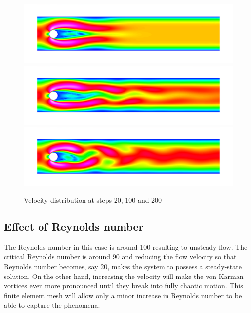 \begin{figure}[h]
\centering
\includegraphics[width=12cm, viewport=0 30 1089 270,clip]{flow20.png}
\includegraphics[width=12cm, viewport=0 30 1089 270,clip]{flow100.png}
\includegraphics[width=12cm, viewport=0 30 1089 270,clip]{flow200.png}
\caption{Velocity distribution at steps 20, 100 and 200}\label{fg:vonkarman_flow}
\end{figure} 


\subsection*{Effect of Reynolds number}
The Reynolds number in this case is around 100 resulting to unsteady flow.
The critical Reynolds number is around 90 and 
reducing the flow velocity so that Reynolds number becomes, say 20, makes the 
system to possess a steady-state solution. On the other hand, increasing the velocity will make the von Karman vortices
even more pronounced until they break into fully chaotic motion. This finite element mesh will allow only 
a minor increase in Reynolds number to be able to capture the phenomena. 

\hfill

